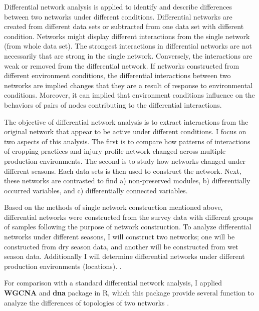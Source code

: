 \begin{enumerate}
Differential network analysis is applied to identify and describe differences between two networks under different conditions. Differential networks are created from different data sets or subtracted from one data set with different condition. Networks might display different interactions from the single network (from whole data set). The strongest interactions in differential networks are not necessarily that are strong in the single network. Conversely, the interactions are weak or removed from the differential network. If networks constructed from different environment conditions, the differential interactions between two networks are implied changes that they are a result of response to environmental conditions. Moreover, it can implied that environment conditions influence on the behaviors of pairs of nodes contributing to the differential interactions. 


The objective of differential network analysis is to extract interactions from the original network that appear to be active under different conditions. I focus on two aspects of this analysis. The first is to compare how patterns of interactions of cropping practices and injury profile network changed across multiple production environments. The second is to study how networks changed under different seasons. Each data sets is then used to construct the network. Next, these networks are contrasted to find a) non-preserved modules, b) differentially occurred variables, and c) differentially connected variables.

Based on the methods of single network construction mentioned above, differential networks were constructed from the survey data with different groups of samples following the purpose of network construction. To analyze differential networks under different seasons, I will construct two networks; one will be constructed from dry season data, and another will be constructed from wet season data. Additionally I will determine differential networks under different production environments (locations).
.

For comparison with a standard differential network analysis, I applied \textbf{WGCNA}  and \textbf{dna}  package in R, which this package provide several function to analyze the differences of topologies of two networks . 



\end{enumerate}
